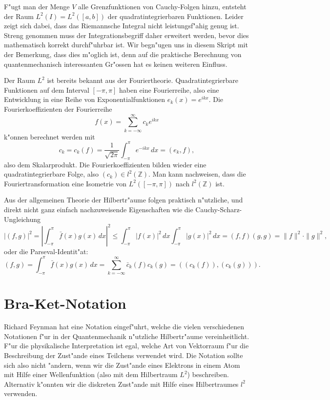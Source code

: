 F"ugt man der Menge $V$ alle Grenzfunktionen von Cauchy-Folgen hinzu,
entsteht der Raum $L^2(I)=L^2([a,b])$ der quadratintegrierbaren Funktionen.
Leider zeigt sich dabei, dass das Riemannsche Integral nicht leistungsf"ahig
genug ist.
Streng genommen muss der Integrationsbegriff daher erweitert
werden, bevor dies mathematisch korrekt durchf"uhrbar ist.
Wir begn"ugen uns in diesem Skript mit der Bemerkung, dass dies m"oglich ist, 
denn auf die praktische Berechnung von quantenmechanisch interessanten
Gr"ossen hat es keinen weiteren Einfluss.

Der Raum $L^2$ ist bereits bekannt aus der Fouriertheorie.
Quadratintegrierbare Funktionen auf dem Interval $[-\pi,\pi]$ haben
eine Fourierreihe, also eine Entwicklung in eine Reihe von
Exponentialfunktionen $e_k(x)=e^{ikx}$.
Die Fourierkoeffizienten der Fourierreihe
\[
f(x)=\sum_{k=-\infty}^\infty c_ke^{ikx}
\]
k"onnen berechnet werden mit
\[
c_k=c_k(f)=\frac{1}{\sqrt{2\pi}}\int_{-\pi}^{\pi} e^{-ikx} \,dx=(e_k,f),
\]
also dem Skalarprodukt. Die Fourierkoeffizienten bilden wieder eine
quadratintegrierbare Folge, also $(c_k)\in l^2(\mathbb Z)$. Man kann
nachweisen, dass die Fouriertransformation eine Isometrie von $L^2([-\pi,\pi])$
nach $l^2(\mathbb Z)$ ist.

Aus der allgemeinen Theorie der Hilbertr"aume
folgen praktisch n"utzliche, und direkt nicht ganz einfach
nachzuweisende Eigenschaften wie die Cauchy-Scharz-Ungleichung
\[
|(f,g)|^2
=
\left|
\int_{-\pi}^\pi \bar f(x)g(x)\,dx
\right|^2
\le 
\int_{-\pi}^\pi |f(x)|^2\,dx
\int_{-\pi}^\pi |g(x)|^2\,dx
=
(f,f)(g,g)=\|f\|^2\cdot\|g\|^2,
\]
oder die Parseval-Identit"at:
\[
(f,g)
=
\int_{-\pi}^{\pi}\bar f(x)g(x)\,dx
=
\sum_{k=-\infty}^\infty \bar c_k(f)c_k(g)
=
((c_k(f)),(c_k(g))).
\]

\section{Bra-Ket-Notation}
%
Richard Feynman hat eine Notation eingef"uhrt, welche die vielen verschiedenen
Notationen f"ur in der Quantenmechanik n"utzliche Hilbertr"aume
vereinheitlicht.
F"ur die physikalische Interpretation ist egal, welche Art von
Vektorraum f"ur die Beschreibung der Zust"ande eines Teilchens verwendet
wird.
Die Notation sollte sich also nicht "andern, wenn wir die Zust"ande eines
Elektrons in einem Atom mit Hilfe einer Wellenfunktion (also mit dem
Hilbertraum $L^2$) beschreiben. Alternativ k"onnten wir die diskreten
Zust"ande mit Hilfe eines Hilbertraumes $l^2$ verwenden.

